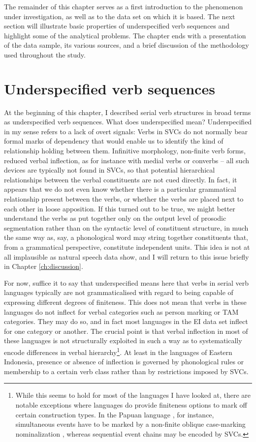 The remainder of this chapter serves as a first introduction to the phenomenon under investigation, as well as to the data set on which it is based. The next section will illustrate basic properties of underspecified verb sequences and highlight some of the analytical problems. The chapter ends with a presentation of the data sample, its various sources, and a brief discussion of the methodology used throughout the study.

\section{Underspecified verb sequences}

At the beginning of this chapter, I described serial verb structures in broad terms as underspecified verb sequences. What does underspecified mean? Underspecified in my sense refers to a lack of overt signals: Verbs in SVCs do not normally bear formal marks of dependency that would enable us to identify the kind of relationship holding between them. Infinitive morphology, non-finite verb forms, reduced verbal inflection, as for instance with medial verbs or converbs -- all such devices are typically not found in SVCs, so that potential hierarchical relationships between the verbal constituents are not cued directly. In fact, it appears that we do not even know whether there is a particular grammatical relationship present between the verbs, or whether the verbs are placed next to each other in loose apposition. If this turned out to be true, we might better understand the verbs as put together only on the output level of prosodic segmentation rather than on the syntactic level of constituent structure, in much the same way as, say, a phonological word may string together constituents that, from a grammatical perspective, constitute independent units. This idea is not at all implausible as natural speech data show, and I will return to this issue briefly in Chapter \ref{ch:discussion}. 

For now, suffice it to say that underspecified means here that verbs in serial verb languages typically are not grammaticalised with regard to being capable of expressing different degrees of finiteness. This does not mean that verbs in these languages do not inflect for verbal categories such as person marking or TAM categories. They may do so, and in fact most languages in the EI data set inflect for one category or another. The crucial point is that verbal inflection in most of these languages is not structurally exploited in such a way as to systematically encode differences in verbal hierarchy\footnote{While this seems to hold for most of the languages I have looked at, there are notable exceptions where languages do provide finiteness options to mark off certain construction types. In the Papuan language , for instance, simultaneous events have to be marked by a non-finite oblique case-marking nominalization \citep[142]{foley2008}, whereas sequential event chains may be encoded by SVCs.}. At least in the languages of Eastern Indonesia, presence or absence of inflection is governed by phonological rules or membership to a certain verb class rather than by restrictions imposed by SVCs.

